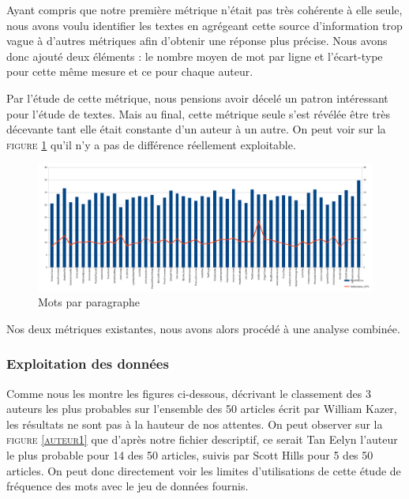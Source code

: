 \documentclass[a4paper,12pt]{report}
\begin{document}
Ayant compris que notre première métrique n'était pas très cohérente à elle seule, nous avons voulu identifier les textes en agrégeant cette source d'information trop vague à d'autres métriques afin d'obtenir une réponse plus précise. Nous avons donc ajouté deux éléments : le nombre moyen de mot par ligne et l'écart-type pour cette même mesure et ce pour chaque auteur.

Par l'étude de cette métrique, nous pensions avoir décelé un patron intéressant pour l'étude de textes. Mais au final, cette métrique seule s'est révélée être très décevante tant elle était constante d'un auteur à un autre. On peut voir sur la \textsc{figure \ref{WPL}} qu'il n'y a pas de différence réellement exploitable.
				
\begin{figure}[hbtp]
\centering
\includegraphics[width=15cm]{fig/WPL.png}
\caption{Mots par paragraphe}
\label{WPL}
\end{figure}

Nos deux métriques existantes, nous avons alors procédé à une analyse combinée.

\subsubsection{Exploitation des données}

Comme nous les montre les figures ci-dessous, décrivant le classement des 3 auteurs les plus probables sur l'ensemble des 50 articles écrit par William Kazer, les résultats ne sont pas à la hauteur de nos attentes. On peut observer sur la \textsc{figure \ref{auteur1}} que d'après notre fichier descriptif, ce serait Tan Eelyn l'auteur le plus probable pour 14 des 50 articles, suivis par Scott Hills pour 5 des 50 articles. On peut donc directement voir les limites d'utilisations de cette étude de fréquence des mots avec le jeu de données fournis. 
\end{document}
